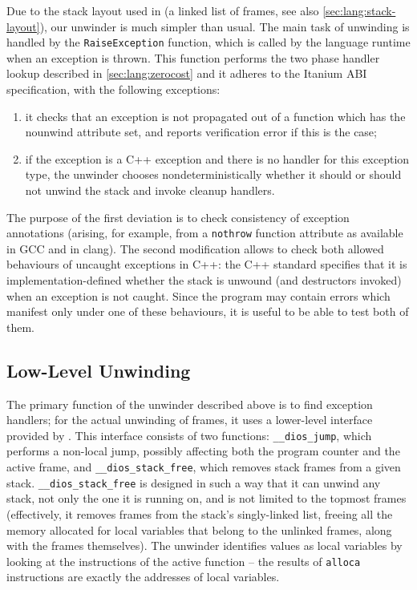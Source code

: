Due to the stack layout used in \divm{} (a linked list of frames, see also
\autoref{sec:lang:stack-layout}), our unwinder is much simpler than
usual. The main task of unwinding is handled by the
\texttt{RaiseException} function, which is called by the language
runtime when an exception is thrown. This function performs the two
phase handler lookup described in \autoref{sec:lang:zerocost} and it
adheres to the Itanium ABI specification, with the following exceptions:

\begin{enumerate}
\def\labelenumi{\roman{enumi}.}
\item
  it checks that an exception is not propagated out of a function which
  has the nounwind attribute set, and reports verification error if this
  is the case;
\item
  if the exception is a C++ exception and there is no handler for this
  exception type, the unwinder chooses nondeterministically whether it
  should or should not unwind the stack and invoke cleanup handlers.
\end{enumerate}

The purpose of the first deviation is to check consistency of exception
annotations (arising, for example, from a \texttt{nothrow} function
attribute as available in GCC and in clang). The second modification
allows \divine{} to check both allowed behaviours of uncaught exceptions in
C++: the C++ standard specifies that it is implementation-defined
whether the stack is unwound (and destructors invoked) when an exception
is not caught. Since the program may contain
errors which manifest only under one of these behaviours, it is useful
to be able to test both of them.

\subsection{Low-Level Unwinding}\label{sec:unwinder:ll}

The primary function of the unwinder described above is to find
exception handlers; for the actual unwinding of frames, it uses a
lower-level interface provided by \dios{}. This interface consists of two
functions: \texttt{\_\_dios\_jump}, which performs a non-local jump,
possibly affecting both the program counter and the active frame, and
\texttt{\_\_dios\_stack\_free}, which removes stack frames from a given
stack. \texttt{\_\_dios\_stack\_free} is designed in such a way that it can
unwind any stack, not only the one it is running on, and is not limited
to the topmost frames (effectively, it removes frames from the stack's
singly-linked list, freeing all the memory allocated for local variables
that belong to the unlinked frames, along with the frames
themselves). The unwinder
identifies values as local variables by looking at the instructions of
the active function -- the results of \texttt{alloca} instructions are
exactly the addresses of local variables.

